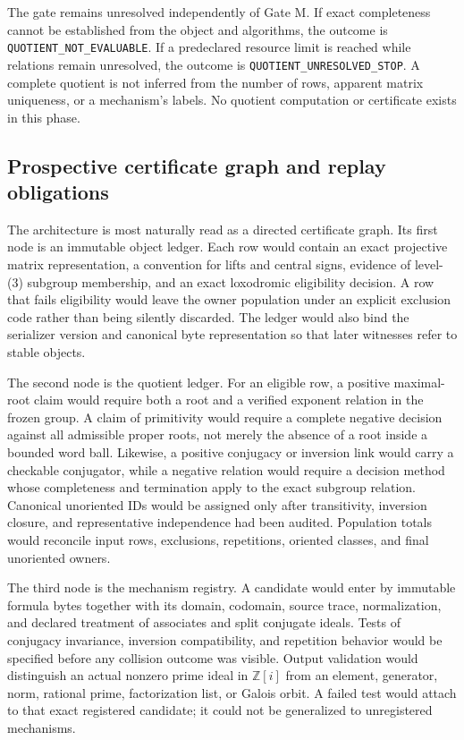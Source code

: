 \documentclass[11pt,a4paper]{article}
\begin{document}
The gate remains unresolved independently of Gate M. If exact completeness cannot be established from the object and algorithms, the outcome is \texttt{QUOTIENT\_NOT\_EVALUABLE}. If a predeclared resource limit is reached while relations remain unresolved, the outcome is \texttt{QUOTIENT\_UNRESOLVED\_STOP}. A complete quotient is not inferred from the number of rows, apparent matrix uniqueness, or a mechanism's labels. No quotient computation or certificate exists in this phase.

\subsection{Prospective certificate graph and replay obligations}

The architecture is most naturally read as a directed certificate graph. Its first node is an immutable object ledger. Each row would contain an exact projective matrix representation, a convention for lifts and central signs, evidence of level-(3) subgroup membership, and an exact loxodromic eligibility decision. A row that fails eligibility would leave the owner population under an explicit exclusion code rather than being silently discarded. The ledger would also bind the serializer version and canonical byte representation so that later witnesses refer to stable objects.

The second node is the quotient ledger. For an eligible row, a positive maximal-root claim would require both a root and a verified exponent relation in the frozen group. A claim of primitivity would require a complete negative decision against all admissible proper roots, not merely the absence of a root inside a bounded word ball. Likewise, a positive conjugacy or inversion link would carry a checkable conjugator, while a negative relation would require a decision method whose completeness and termination apply to the exact subgroup relation. Canonical unoriented IDs would be assigned only after transitivity, inversion closure, and representative independence had been audited. Population totals would reconcile input rows, exclusions, repetitions, oriented classes, and final unoriented owners.

The third node is the mechanism registry. A candidate would enter by immutable formula bytes together with its domain, codomain, source trace, normalization, and declared treatment of associates and split conjugate ideals. Tests of conjugacy invariance, inversion compatibility, and repetition behavior would be specified before any collision outcome was visible. Output validation would distinguish an actual nonzero prime ideal in \(\mathbb{Z}[i]\) from an element, generator, norm, rational prime, factorization list, or Galois orbit. A failed test would attach to that exact registered candidate; it could not be generalized to unregistered mechanisms.
\end{document}

